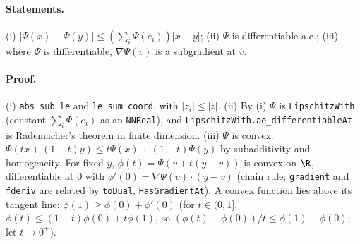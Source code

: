 \paragraph{Statements.} (i) $|\Psi(x)-\Psi(y)|\le(\sum_i\Psi(e_i))|x-y|$; (ii) $\Psi$ is differentiable
a.e.; (iii) where $\Psi$ is differentiable, $\nabla\Psi(v)$ is a subgradient at $v$.
\paragraph{Proof.} (i) \texttt{abs\_sub\_le} and \texttt{le\_sum\_coord}, with $|z_i|\le|z|$.
(ii) By (i) $\Psi$ is \texttt{LipschitzWith} (constant $\sum_i\Psi(e_i)$ as an \texttt{NNReal}), and
\texttt{LipschitzWith.ae\_differentiableAt} is Rademacher's theorem in finite dimension.
(iii) $\Psi$ is convex: $\Psi(tx+(1-t)y)\le t\Psi(x)+(1-t)\Psi(y)$ by subadditivity and homogeneity.
For fixed $y$, $\phi(t)=\Psi(v+t(y-v))$ is convex on $\R$, differentiable at $0$ with
$\phi'(0)=\nabla\Psi(v)\cdot(y-v)$ (chain rule; \texttt{gradient} and \texttt{fderiv} are related by
\texttt{toDual}, \texttt{HasGradientAt}). A convex function lies above its tangent line:
$\phi(1)\ge\phi(0)+\phi'(0)$ (for $t\in(0,1]$, $\phi(t)\le(1-t)\phi(0)+t\phi(1)$, so
$(\phi(t)-\phi(0))/t\le\phi(1)-\phi(0)$; let $t\to0^+$).
